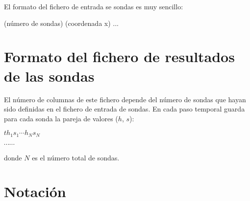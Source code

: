 \documentclass[a4paper,12pt]{report}
\begin{document}
El formato del fichero de entrada se sondas es muy sencillo:

\begin{verbatimtab}
	(número de sondas)
	(coordenada x)
	...
\end{verbatimtab}

\section{Formato del fichero de resultados de las sondas}
El número de columnas de este fichero depende del número de sondas que hayan sido definidas en el fichero de entrada de sondas. 
En cada paso temporal guarda para cada sonda la pareja de valores ($h$, $s$):

\hspace{1.8cm}$t$\hspace{0.9cm}$h_1$\hspace{0.9cm}$s_1$\hspace{0.9cm}$\cdots$\hspace{0.9cm}$h_N$\hspace{0.9cm}$s_N$

\hspace{3.8cm} $\cdots \cdots$

\noindent donde $N$ es el número total de sondas. 

\clearpage
\section*{Notación}
\end{document}
